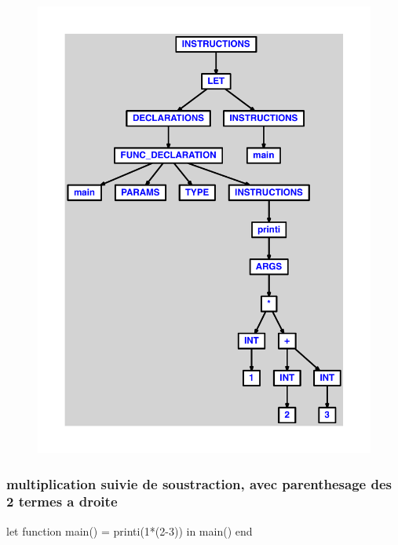 \documentclass{article}
\begin{document}
\begin{figure}[H]\centering\includegraphics[max width=\textwidth]{ast/ast_91.pdf}\end{figure}\subsubsection{multiplication suivie de soustraction, avec parenthesage des 2 termes a droite}
\begin{verbatimtab}
let function main() = printi(1*(2-3)) in main() end
\end{verbatimtab}
\end{document}
